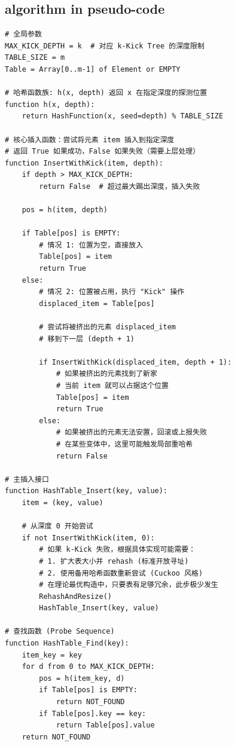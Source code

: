 \documentclass[a4paper,12pt]{ctexart}
\begin{document}
\subsection{algorithm in pseudo-code}
\begin{lstlisting}
# 全局参数
MAX_KICK_DEPTH = k  # 对应 k-Kick Tree 的深度限制
TABLE_SIZE = m
Table = Array[0..m-1] of Element or EMPTY

# 哈希函数族: h(x, depth) 返回 x 在指定深度的探测位置
function h(x, depth):
    return HashFunction(x, seed=depth) % TABLE_SIZE

# 核心插入函数：尝试将元素 item 插入到指定深度
# 返回 True 如果成功，False 如果失败（需要上层处理）
function InsertWithKick(item, depth):
    if depth > MAX_KICK_DEPTH:
        return False  # 超过最大踢出深度，插入失败
    
    pos = h(item, depth)
    
    if Table[pos] is EMPTY:
        # 情况 1: 位置为空，直接放入
        Table[pos] = item
        return True
    else:
        # 情况 2: 位置被占用，执行 "Kick" 操作
        displaced_item = Table[pos]
        
        # 尝试将被挤出的元素 displaced_item 
        # 移到下一层 (depth + 1)

        if InsertWithKick(displaced_item, depth + 1):
            # 如果被挤出的元素找到了新家
            # 当前 item 就可以占据这个位置
            Table[pos] = item
            return True
        else:
            # 如果被挤出的元素无法安置，回滚或上报失败
            # 在某些变体中，这里可能触发局部重哈希
            return False

# 主插入接口
function HashTable_Insert(key, value):
    item = (key, value)
    
    # 从深度 0 开始尝试
    if not InsertWithKick(item, 0):
        # 如果 k-Kick 失败，根据具体实现可能需要：
        # 1. 扩大表大小并 rehash (标准开放寻址)
        # 2. 使用备用哈希函数重新尝试 (Cuckoo 风格)
        # 在理论最优构造中，只要表有足够冗余，此步极少发生
        RehashAndResize()
        HashTable_Insert(key, value)

# 查找函数 (Probe Sequence)
function HashTable_Find(key):
    item_key = key
    for d from 0 to MAX_KICK_DEPTH:
        pos = h(item_key, d)
        if Table[pos] is EMPTY:
            return NOT_FOUND
        if Table[pos].key == key:
            return Table[pos].value
    return NOT_FOUND
\end{lstlisting}
\end{document}
